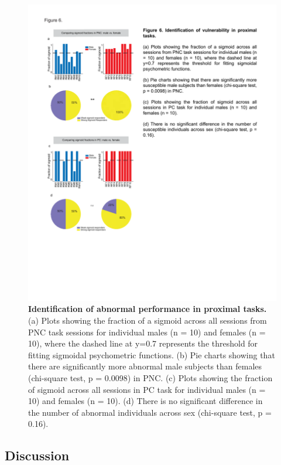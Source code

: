 \documentclass{article}
\begin{document}
\vspace{1em}

\begin{figure}[H]
  \centering
  \includegraphics[width=\textwidth, trim=50 100 50 100]{Figs/Alcohol_main_6.pdf}
  \caption{\textbf{Identification of abnormal performance in proximal tasks.} (a) Plots showing the fraction of a sigmoid across all sessions from PNC task sessions for individual males (n = 10) and females (n = 10), where the dashed line at y=0.7 represents the threshold for fitting sigmoidal psychometric functions. (b) Pie charts showing that there are significantly more abnormal male subjects than females (chi-square test, p = 0.0098) in PNC. (c) Plots showing the fraction of sigmoid across all sessions in PC task for individual males (n = 10) and females (n = 10). (d) There is no significant difference in the number of abnormal individuals across sex (chi-square test, p = 0.16).}
  \label{fig:alcohol_main_6}
\end{figure}

\clearpage

\subsection{Discussion}
\end{document}
